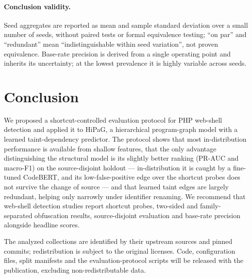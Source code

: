 \documentclass[pdflatex,sn-mathphys-num]{sn-jnl}
\begin{document}
\paragraph{Conclusion validity.} Seed aggregates are reported as mean and
sample standard deviation over a small number of seeds, without paired tests or
formal equivalence testing; ``on par'' and ``redundant'' mean
``indistinguishable within seed variation'', not proven equivalence. Base-rate
precision is derived from a single operating point and inherits its
uncertainty; at the lowest prevalence it is highly variable across seeds.

\section{Conclusion}\label{sec:conclusion}
We proposed a shortcut-controlled evaluation protocol for PHP web-shell
detection and applied it to HiPaG, a hierarchical program-graph model with a
learned taint-dependency predictor. The protocol shows that most
in-distribution performance is available from shallow features, that the only
advantage distinguishing the structural model is its slightly better ranking
(PR-AUC and macro-F1) on the source-disjoint holdout --- in-distribution it is
caught by a fine-tuned CodeBERT, and its low-false-positive edge over the
shortcut probes does not survive the change of source --- and that learned
taint edges are largely redundant,
helping only narrowly under identifier renaming. We recommend that web-shell
detection studies report shortcut probes, two-sided and family-separated
obfuscation results, source-disjoint evaluation and base-rate precision
alongside headline scores.

\backmatter

The analyzed collections are identified by their upstream sources and pinned
commits; redistribution is subject to the original licenses. Code,
configuration files, split manifests and the evaluation-protocol scripts will
be released with the publication, excluding non-redistributable data.
\end{document}
